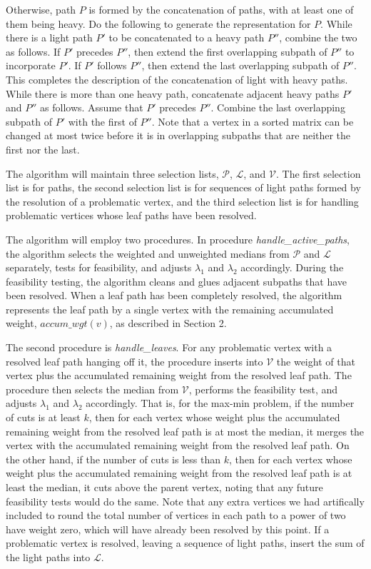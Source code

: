 \documentclass[12pt]{article}
\begin{document}
\begin{spacing}{1.5}
Otherwise, path $P$ is formed by the concatenation of paths, with at least one of them being heavy. Do the following to generate the representation for $P$. While there is a light path $P'$ to be concatenated to a heavy path $P''$, combine the two as follows. If $P'$ precedes $P''$, then extend the first overlapping subpath of $P''$ to incorporate $P'$. If $P'$ follows $P''$, then extend the last overlapping subpath of $P''$. This completes the description of the concatenation of light with heavy paths. While there is more than one heavy path, concatenate adjacent heavy paths $P'$ and $P''$ as follows. Assume that $P'$ precedes $P''$. Combine the last overlapping subpath of $P'$ with the first of $P''$. Note that a vertex in a sorted matrix can be changed at most twice before it is in overlapping subpaths that are neither the first nor the last. 

\vskip 0.2in\noindent
The algorithm will maintain three selection lists, $\mathcal{P}$, $\mathcal{L}$, and $\mathcal{V}$. The first selection list is for paths, the second selection list is for sequences of light paths formed by the resolution of a problematic vertex, and the third selection list is for handling problematic vertices whose leaf paths have been resolved.

The algorithm will employ two procedures. In procedure {\it handle\_active\_paths}, the algorithm selects the weighted and unweighted medians from $\mathcal{P}$ and $\mathcal{L}$ separately, tests for feasibility, and adjusts $\lambda_1$ and $\lambda_2$ accordingly. During the feasibility testing, the algorithm cleans and glues adjacent subpaths that have been resolved. When a leaf path has been completely resolved, the algorithm represents the leaf path by a single vertex with the remaining accumulated weight, $accum\_wgt(v)$, as described in Section 2.

The second procedure is {\it handle\_leaves}.  For any problematic vertex with a resolved leaf path hanging off it, the procedure inserts into $\mathcal{V}$ the weight of that vertex plus the accumulated remaining weight from the resolved leaf path. The procedure then selects the median from $\mathcal{V}$, performs the feasibility test, and adjusts $\lambda_1$ and $\lambda_2$ accordingly. That is, for the max-min problem, if the number of cuts is at least $k$, then for each vertex whose weight plus the accumulated remaining weight from the resolved leaf path is at most the median, it merges the vertex with the accumulated remaining weight from the resolved leaf path. On the other hand, if the number of cuts is less than $k$, then for each vertex whose weight plus the accumulated remaining weight from the resolved leaf path is at least the median, it cuts above the parent vertex, noting that any future feasibility tests would do the same. Note that any extra vertices we had artifically included to round the total number of vertices in each path to a power of two have weight zero, which will have already been resolved by this point. If a problematic vertex is resolved, leaving a sequence of light paths, insert the sum of the light paths into $\mathcal{L}$.


\end{spacing}
\end{document}
